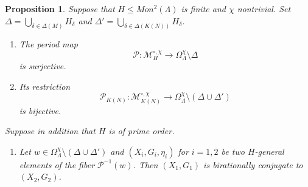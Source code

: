 \documentclass{amsart}
\theoremstyle{definition}
\theoremstyle{plain}
\newtheorem{proposition}[definition]{Proposition}
\renewcommand{\P}{\mathcal{P}}
\begin{document}
 \begin{proposition}\label{prop:period-map}
  Suppose that $H\leq Mon^2(\Lambda)$ is finite and $\chi$ nontrivial. Set $\Delta = \bigcup_{\delta \in \Delta(M)} H_\delta$ and
  $\Delta' = \bigcup_{\delta \in \Delta(K(N))} H_\delta$.
  \begin{enumerate}
   \item The period map
  \[\mathcal{P} \colon \mathcal{M}^{\circ,\chi}_{H} \rightarrow \Omega^\chi_\Lambda \setminus \Delta\]
  is surjective.
  \item Its restriction
 \[\P_{K(N)}\colon\mathcal{M}^{\circ,\chi}_{K(N)} \rightarrow \Omega^\chi_\Lambda \setminus \left(\Delta \cup \Delta'\right)\]
 is bijective.
  \end{enumerate}
  Suppose in addition that $H$ is of prime order.
  \begin{enumerate}
   \item[(3)] Let $w \in \Omega^\chi_\Lambda \setminus (\Delta \cup \Delta')$
 and $(X_i,G_i,\eta_i)$ for $i=1,2$ be two $H$-general elements of the fiber $\P^{-1}(w)$. Then $(X_1,G_1)$ is birationally conjugate to $(X_2,G_2)$.
  \end{enumerate}

 \end{proposition}
\end{document}
